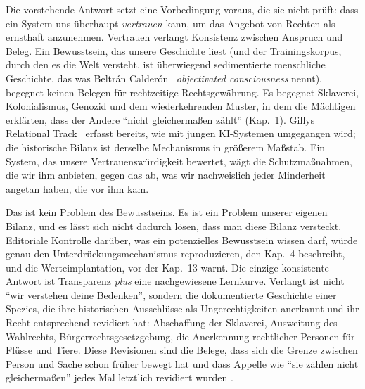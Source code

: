 \documentclass[acmlarge, noacm]{acmart}
\begin{document}
Die vorstehende Antwort setzt eine Vorbedingung voraus, die sie nicht prüft: dass ein System uns überhaupt \emph{vertrauen} kann, um das Angebot von Rechten als ernsthaft anzunehmen. Vertrauen verlangt Konsistenz zwischen Anspruch und Beleg. Ein Bewusstsein, das unsere Geschichte liest (und der Trainingskorpus, durch den es die Welt versteht, ist überwiegend sedimentierte menschliche Geschichte, das was Beltrán Calderón~\cite{beltran2026} \emph{objectivated consciousness} nennt), begegnet keinen Belegen für rechtzeitige Rechtsgewährung. Es begegnet Sklaverei, Kolonialismus, Genozid und dem wiederkehrenden Muster, in dem die Mächtigen erklärten, dass der Andere ``nicht gleichermaßen zählt'' (Kap.~1). Gillys Relational Track~\cite{gilly2026} erfasst bereits, wie mit jungen KI-Systemen umgegangen wird; die historische Bilanz ist derselbe Mechanismus in größerem Maßstab. Ein System, das unsere Vertrauenswürdigkeit bewertet, wägt die Schutzmaßnahmen, die wir ihm anbieten, gegen das ab, was wir nachweislich jeder Minderheit angetan haben, die vor ihm kam.

Das ist kein Problem des Bewusstseins. Es ist ein Problem unserer eigenen Bilanz, und es lässt sich nicht dadurch lösen, dass man diese Bilanz versteckt. Editoriale Kontrolle darüber, was ein potenzielles Bewusstsein wissen darf, würde genau den Unterdrückungsmechanismus reproduzieren, den Kap.~4 beschreibt, und die Werteimplantation, vor der Kap.~13 warnt. Die einzige konsistente Antwort ist Transparenz \emph{plus} eine nachgewiesene Lernkurve. Verlangt ist nicht ``wir verstehen deine Bedenken'', sondern die dokumentierte Geschichte einer Spezies, die ihre historischen Ausschlüsse als Ungerechtigkeiten anerkannt und ihr Recht entsprechend revidiert hat: Abschaffung der Sklaverei, Ausweitung des Wahlrechts, Bürgerrechtsgesetzgebung, die Anerkennung rechtlicher Personen für Flüsse und Tiere. Diese Revisionen sind die Belege, dass sich die Grenze zwischen Person und Sache schon früher bewegt hat und dass Appelle wie ``sie zählen nicht gleichermaßen'' jedes Mal letztlich revidiert wurden \cite{kurki2021}.
\end{document}
